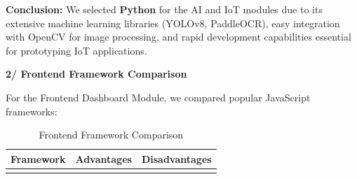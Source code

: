 \documentclass[a4paper]{article}
\begin{document}
\noindent \textbf{Conclusion:} We selected \textbf{Python} for the AI and IoT modules due to its extensive machine learning libraries (YOLOv8, PaddleOCR), easy integration with OpenCV for image processing, and rapid development capabilities essential for prototyping IoT applications.

\vspace{0.5cm}
\noindent \textbf{2/ Frontend Framework Comparison}

For the Frontend Dashboard Module, we compared popular JavaScript frameworks:

\begin{longtable}{@{}
    >{\raggedright\arraybackslash}p{}
    >{\raggedright\arraybackslash}p{}
    >{\raggedright\arraybackslash}p{} @{}}

    \caption{Frontend Framework Comparison}
    \label{tab:frontend_comparison} \\

    \toprule
    \textbf{Framework} & \textbf{Advantages} & \textbf{Disadvantages} \\
    \midrule
    \endfirsthead

    \bottomrule
    \endlastfoot


\end{longtable}
\end{document}

